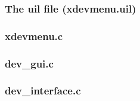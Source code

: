 \newpage
\subsubsection{The uil file (xdevmenu.uil)}


\newpage
\subsubsection{xdevmenu.c}


\newpage
\subsubsection{dev\_gui.c}


\newpage
\subsubsection{dev\_interface.c}

